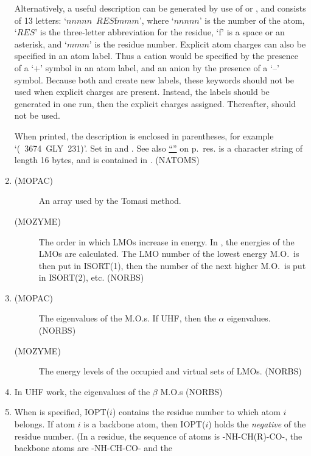 \begin{enumerate}
Alternatively, a useful description can be generated by use of 
or , and consists of 13 letters: `$nnnnn$~$RES$f$mmm$', where
`$nnnnn$' is the number of the atom, `$RES$' is the three-letter abbreviation
for the residue, `f' is a space or an asterisk, and `$mmm$' is the residue
number.  Explicit atom charges can also be specified in an atom label.  Thus a
cation would be specified by the presence of a `+' symbol in an atom label, and
an anion by the presence of a `--' symbol. Because both  and
 create new labels, these keywords should not be used when explicit
charges are present.  Instead, the labels should be generated in one run, then
the explicit charges assigned.  Thereafter,  should not be used.

When printed, the description is enclosed in parentheses, for example
`(~3674~GLY~231)'.  Set in  and . See also
\hyperref[pageref]{``''}{ on p.~}{}{res}. 
is a character string of length 16 bytes, and is  contained in
. (NATOMS)
\item 
\begin{description}
\item[(MOPAC) ] An array used by the Tomasi method.
\item[(MOZYME) ] The order in which LMOs increase in energy. In
, the energies of the LMOs are calculated.  The LMO number of the
lowest energy M.O.\ is then put in ISORT(1), then the number of the next higher
M.O.\ is put in ISORT(2), etc. (NORBS)
\end{description}
\addtocounter{enumi}{2} 
\item 
\begin{description}
\item[(MOPAC) ] The eigenvalues of the M.O.s.  If UHF, then the
$\alpha$ eigenvalues. (NORBS)
\item[(MOZYME) ] The energy levels of the occupied and virtual
sets of LMOs. (NORBS)
\end{description}
\item {} In UHF work, the eigenvalues of the $\beta$ M.O.s (NORBS)
\item {} When  is specified, IOPT($i$) contains the
residue number to which atom $i$ belongs. If atom $i$ is a backbone atom, then
IOPT($i$) holds the {\em negative} of the residue number.  (In a residue, the
sequence of atoms is -NH-CH(R)-CO-, the backbone atoms are -NH-CH-CO- and the

\end{enumerate}
